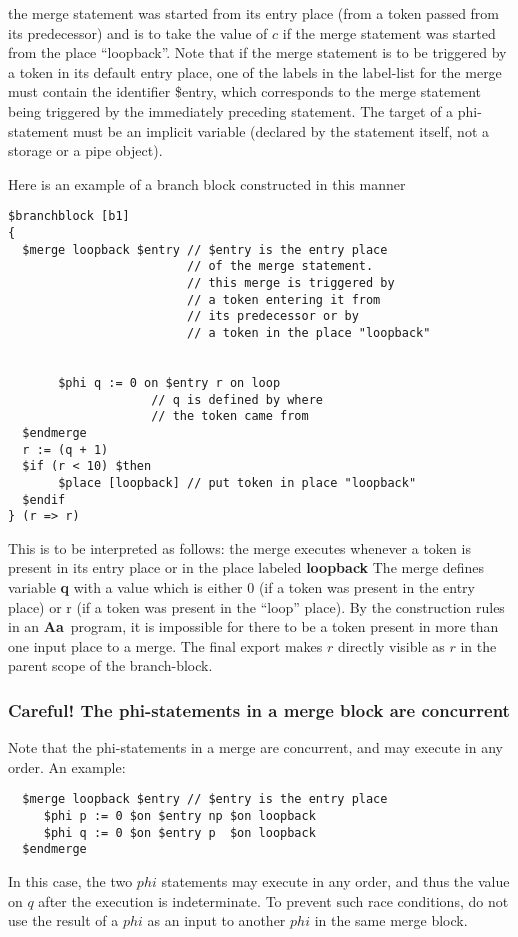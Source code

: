 \documentclass{article}
\newcommand{\Aa}{{\bf Aa}~}
\begin{document}
\begin{itemize}
\begin{itemize}
\begin{itemize}
the merge statement was started from its entry place (from a
token passed from its predecessor) and is to take the value of $c$
if the merge statement was started from the place ``loopback''.
Note that if the merge statement is to be triggered by a
token in its default entry place, one of the labels in the
label-list for the merge must contain the identifier \$entry,
which corresponds to the merge statement being triggered
by the immediately preceding statement.
The target of a phi-statement must be an implicit variable
(declared by the statement itself, not a storage or a pipe
object).
\end{itemize}
\end{itemize}

Here is an example of a branch block constructed in this manner
\begin{verbatim}
$branchblock [b1] 
{
  $merge loopback $entry // $entry is the entry place
                         // of the merge statement.
                         // this merge is triggered by
                         // a token entering it from
                         // its predecessor or by  
                         // a token in the place "loopback"


       $phi q := 0 on $entry r on loop 
                    // q is defined by where 
                    // the token came from
  $endmerge
  r := (q + 1)
  $if (r < 10) $then 
       $place [loopback] // put token in place "loopback"
  $endif
} (r => r)
\end{verbatim}%
This is to be interpreted as follows: the merge executes
whenever a token is present in its entry place  or in 
the place labeled {\bf loopback}
The merge defines variable {\bf q} with a value which is
either 0 (if a token was present in the entry place)
or r (if a token was present in the ``loop'' place).
By the construction rules in an \Aa program, it is
impossible for there to be a token present in more
than one input place to a merge.  The final export
makes $r$ directly visible as $r$  in the parent scope of the
branch-block.
\end{itemize}

\subsubsection{Careful! The phi-statements in a merge block are concurrent}

Note that the phi-statements in a merge are concurrent, and
may execute in any order.
An example:
\begin{verbatim}
  $merge loopback $entry // $entry is the entry place
     $phi p := 0 $on $entry np $on loopback
     $phi q := 0 $on $entry p  $on loopback
  $endmerge
\end{verbatim}
In this case, the two $phi$ statements may execute
in any order, and thus the value on $q$ after the execution
is indeterminate.  To prevent such race conditions, do not
use the result of a $phi$ as an input to another $phi$ in
the same merge block.
\end{document}
